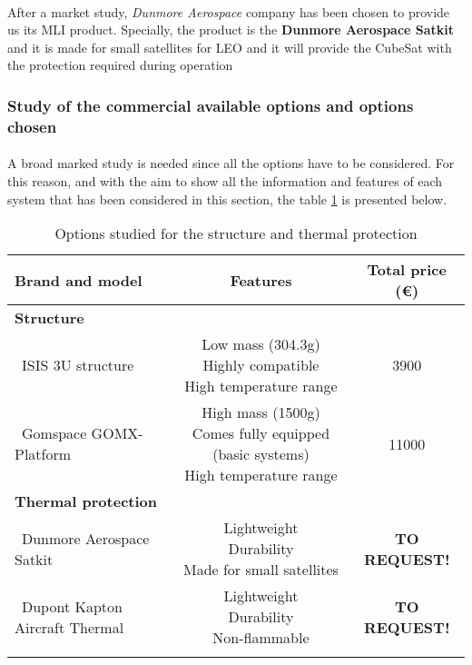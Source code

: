 \paragraph{} 
After a market study, \textit{Dunmore Aerospace} company has been chosen to provide us its MLI product. Specially, the product is the \textbf{Dunmore Aerospace Satkit} and it is made for small satellites for LEO and it will provide the CubeSat with the protection required during operation

\subsubsection{Study of the commercial available options and options chosen}
\paragraph{}A broad marked study is needed since all the options have to be considered. For this reason, and with the aim to show all the information and features of each system that has been considered in this section, the table \ref{structureoptions} is presented below.


\begin{longtable}{| l | c | c | }
\hline
\rowcolor[gray]{0.80}	\textbf{Brand and model} &  \textbf{Features}     & \textbf{Total price (\euro)}   \\
\hline
\endfirsthead

\rowcolor[gray]{0.85} \textbf{Structure} &  &  \\
	   ~ISIS 3U structure & \makecell{Low mass (304.3g) \\ Highly compatible \\ High temperature range} & 3900 \\
	   \hline
	   ~Gomspace GOMX-Platform & \makecell{High mass (1500g) \\ Comes fully equipped (basic systems) \\ High temperature range} & 11000 \\
	   \hline
\rowcolor[gray]{0.85} \textbf{Thermal protection} &  &  \\
	   ~Dunmore Aerospace Satkit & \makecell{Lightweight \\ Durability \\ Made for small satellites}& \textbf{TO REQUEST!} \\
	   \hline
	   ~Dupont Kapton Aircraft Thermal & \makecell{Lightweight \\ Durability \\ Non-flammable} & \textbf{TO REQUEST!} \\
	\hline

\caption{Options studied for the structure and thermal protection}
\label{structureoptions}
\end{longtable}

